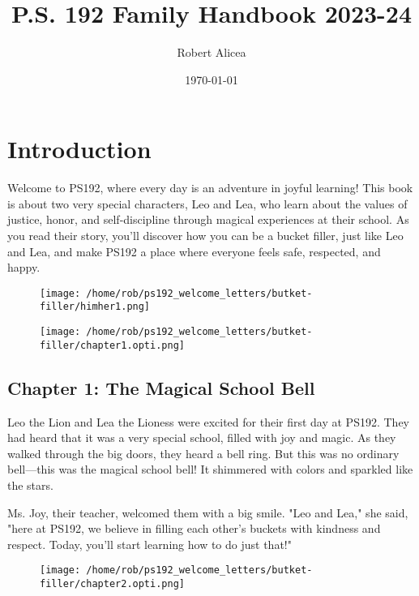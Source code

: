 \documentclass[11pt]{article}
\author{Robert Alicea}
\date{\today}
\title{P.S. 192 Family Handbook 2023-24}
\begin{document}


\pagenumbering{\fancyhf{}}
\pagestyle{headings}

\fancyhead[R]{\thepage}

\pagestyle{fancy}
\renewcommand{\footrulewidth}{1px}


\clearpage
\clearpage \tableofcontents \clearpage

\section{Introduction}
\label{sec:orga154fad}
Welcome to PS192, where every day is an adventure in joyful learning! This book is about two very special characters, Leo and Lea, who learn about the values of justice, honor, and self-discipline through magical experiences at their school. As you read their story, you’ll discover how you can be a bucket filler, just like Leo and Lea, and make PS192 a place where everyone feels safe, respected, and happy.
\begin{figure}[b]  %
  \centering \texttt{[image: /home/rob/ps192\_welcome\_letters/butket-filler/himher1.png]}
  \label{fig:fronpage bottom_image}
\end{figure}

\newpage
\begin{figure}[h]  %
  \centering \texttt{[image: /home/rob/ps192\_welcome\_letters/butket-filler/chapter1.opti.png]}
  \label{fig:fronpage bottom_image}
\end{figure}
\subsection{Chapter 1: The Magical School Bell}
\label{sec:org49579b5}
Leo the Lion and Lea the Lioness were excited for their first day at PS192. They had heard that it was a very special school, filled with joy and magic. As they walked through the big doors, they heard a bell ring. But this was no ordinary bell—this was the magical school bell! It shimmered with colors and sparkled like the stars.

Ms. Joy, their teacher, welcomed them with a big smile. "Leo and Lea," she said, "here at PS192, we believe in filling each other's buckets with kindness and respect. Today, you'll start learning how to do just that!"
\newpage
\begin{figure}[h]  %
  \centering \texttt{[image: /home/rob/ps192\_welcome\_letters/butket-filler/chapter2.opti.png]}
  \label{fig:fronpage bottom_image}
\end{figure}
\end{document}
